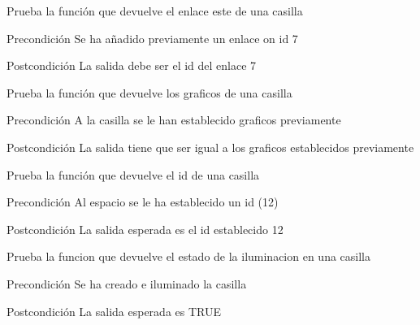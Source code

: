 \begin{DoxyRefList}
\item[\label{test__test000292}%
\hypertarget{test__test000292}{}%
Global \hyperlink{space__test_8c_a354adb2722b06ec65b7212d2736d6417}{test1\-\_\-space\-\_\-get\-\_\-east} ()]Prueba la función que devuelve el enlace este de una casilla \begin{DoxyPrecond}{Precondición}
Se ha añadido previamente un enlace on id 7 
\end{DoxyPrecond}
\begin{DoxyPostcond}{Postcondición}
La salida debe ser el id del enlace 7  
\end{DoxyPostcond}

\item[\label{test__test000282}%
\hypertarget{test__test000282}{}%
Global \hyperlink{space__test_8c_ad28a0ad7ef1f4b17c0500d763b1d8740}{test1\-\_\-space\-\_\-get\-\_\-graphics} ()]Prueba la función que devuelve los graficos de una casilla \begin{DoxyPrecond}{Precondición}
A la casilla se le han establecido graficos previamente 
\end{DoxyPrecond}
\begin{DoxyPostcond}{Postcondición}
La salida tiene que ser igual a los graficos establecidos previamente  
\end{DoxyPostcond}

\item[\label{test__test000271}%
\hypertarget{test__test000271}{}%
Global \hyperlink{space__test_8c_a920df9e02482f4f1e6a5ebcaec523860}{test1\-\_\-space\-\_\-get\-\_\-id} ()]Prueba la función que devuelve el id de una casilla \begin{DoxyPrecond}{Precondición}
Al espacio se le ha establecido un id (12) 
\end{DoxyPrecond}
\begin{DoxyPostcond}{Postcondición}
La salida esperada es el id establecido 12  
\end{DoxyPostcond}

\item[\label{test__test000319}%
\hypertarget{test__test000319}{}%
Global \hyperlink{space__test_8c_a9f7a49713bb4a0fea82834a4a84b31b5}{test1\-\_\-space\-\_\-get\-\_\-iluminated} ()]Prueba la funcion que devuelve el estado de la iluminacion en una casilla \begin{DoxyPrecond}{Precondición}
Se ha creado e iluminado la casilla 
\end{DoxyPrecond}
\begin{DoxyPostcond}{Postcondición}
La salida esperada es T\-R\-U\-E  
\end{DoxyPostcond}


\end{DoxyRefList}
